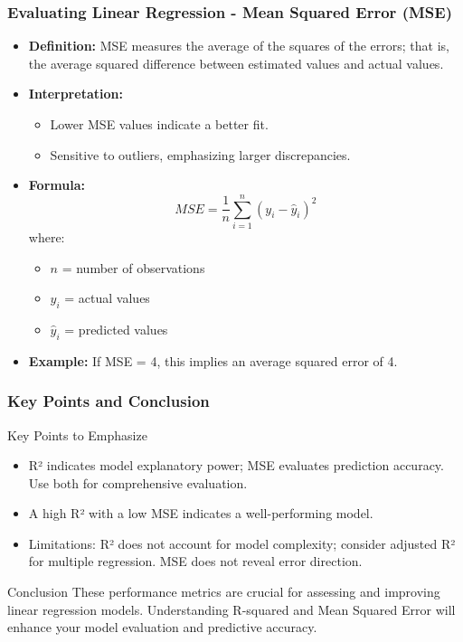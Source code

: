 \documentclass[aspectratio=169]{beamer}
\begin{document}
\begin{frame}[fragile]
    \frametitle{Evaluating Linear Regression - Mean Squared Error (MSE)}
    \begin{itemize}
        \item \textbf{Definition:} MSE measures the average of the squares of the errors; that is, the average squared difference between estimated values and actual values.
        \item \textbf{Interpretation:}
        \begin{itemize}
            \item Lower MSE values indicate a better fit.
            \item Sensitive to outliers, emphasizing larger discrepancies.
        \end{itemize}
        \item \textbf{Formula:}
        \begin{equation}
            MSE = \frac{1}{n} \sum_{i=1}^{n} (y_i - \hat{y}_i)^2
        \end{equation}
        where:
        \begin{itemize}
            \item \( n \) = number of observations
            \item \( y_i \) = actual values
            \item \( \hat{y}_i \) = predicted values
        \end{itemize}
        \item \textbf{Example:} If MSE = 4, this implies an average squared error of 4.
    \end{itemize}
\end{frame}

\begin{frame}[fragile]
    \frametitle{Key Points and Conclusion}
    \begin{block}{Key Points to Emphasize}
        \begin{itemize}
            \item R² indicates model explanatory power; MSE evaluates prediction accuracy. Use both for comprehensive evaluation.
            \item A high R² with a low MSE indicates a well-performing model.
            \item Limitations: R² does not account for model complexity; consider adjusted R² for multiple regression. MSE does not reveal error direction.
        \end{itemize}
    \end{block}
    \begin{block}{Conclusion}
        These performance metrics are crucial for assessing and improving linear regression models. Understanding R-squared and Mean Squared Error will enhance your model evaluation and predictive accuracy.
    \end{block}
\end{frame}
\end{document}
